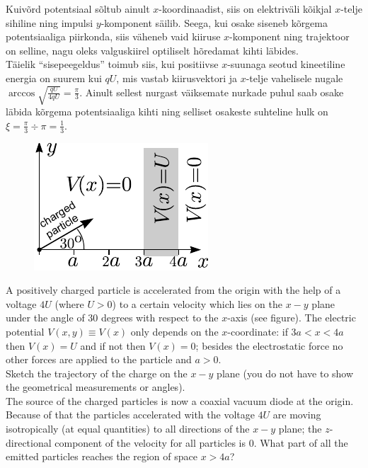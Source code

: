 {\ifSolution
\osa Kuivõrd potentsiaal sõltub ainult $x$-koordinaadist, siis on elektriväli kõikjal $x$-telje sihiline ning
impulsi $y$-komponent säilib. Seega, kui osake siseneb kõrgema potentsiaaliga piirkonda, siis 
väheneb vaid kiiruse $x$-komponent ning
trajektoor on selline, nagu oleks valguskiirel optiliselt hõredamat kihti läbides.\\
\osa Täielik \enquote{sisepeegeldus} toimub siis, kui positiivse $x$-suunaga 
seotud kineetiline energia on suurem kui $qU$, mis vastab kiirusvektori 
ja $x$-telje vahelisele nugale $\arccos \sqrt{\frac {qU}{4qU}}=\frac \pi 3$. Ainult sellest nurgast väiksemate nurkade puhul saab osake läbida kõrgema 
potentsiaaliga kihti ning selliset osakeste suhteline hulk on $\xi = \frac \pi 3 \div \pi = \frac 13$.
\fi


\ifEngStatement
\begin{figure}%
\vspace{-10pt}
\includegraphics[width=\linewidth]{2012-v3g-09-laeng_ing}%
\end{figure}
A positively charged particle is accelerated from the origin with the help of a voltage $4U$ (where $U>0$) to a certain velocity which lies on the $x-y$ plane under the angle of $30$ degrees with respect to the $x$-axis (see figure). The electric potential $V(x,y)\equiv V(x)$ only depends on the $x$-coordinate: if $3a<x<4a$ then $V(x)=U$ and if not then $V(x)=0$; besides the electrostatic force no other forces are applied to the particle and $a>0$.\\
\osa Sketch the trajectory of the charge on the $x-y$ plane (you do not have to show the geometrical measurements or angles).\\
\osa The source of the charged particles is now a coaxial vacuum diode at the origin. Because of that the particles accelerated with the voltage $4U$ are moving isotropically (at equal quantities) to all directions of the $x-y$ plane; the $z$-directional component of the velocity for all particles is 0. What part of all the emitted particles reaches the region of space $x>4a$?
\fi


}
